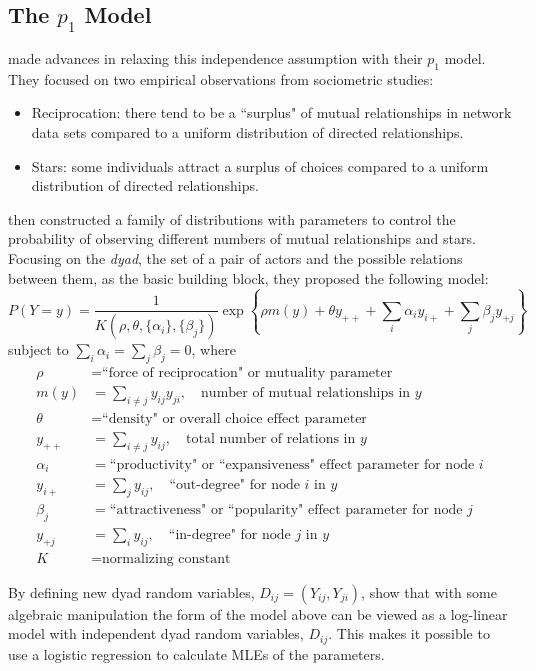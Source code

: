 \subsection{The $p_1$ Model}
\citet{Holland:1981} made advances in relaxing this independence assumption  with their $p_1$ model.  They focused on two empirical observations from sociometric studies:
\begin{itemize}
\item Reciprocation: there tend to be a ``surplus" of mutual relationships in network data sets compared to a uniform distribution of directed relationships.
\item Stars: some individuals attract a surplus of choices compared to a uniform distribution of directed relationships.
\end{itemize}
\citeauthor{Holland:1981} then constructed a family of distributions with parameters to control the probability of observing different numbers of mutual relationships and stars.  
Focusing on the \textit{dyad}, the set of a pair of actors and the possible relations between them, as the basic building block, they proposed the following model:
\[
	P( Y = y ) = \frac{1}{ K( \rho, \theta, \{ \alpha_i \}, \{\beta_j \} )}\exp \left \{  \rho m(y) + \theta y_{++} + \sum_i \alpha_i y_{i+} +  \sum_j \beta_j y_{+j}\right \}
\]
subject to $\sum_i \alpha_i = \sum_j \beta_j = 0$, where
\begin{align*}
	\rho &= \text{``force of reciprocation" or mutuality parameter}\\
	m(y) &= \sum_{i \neq j} y_{ij}y_{ji}, \quad \text{number of mutual relationships in $y$}\\
	\theta &= \text{``density" or overall choice effect parameter}\\
	y_{++} &= \sum_{i \neq j} y_{ij}, \quad  \text{total number of relations in $y$}\\
	\alpha_i &= \text{``productivity" or ``expansiveness" effect parameter for node $i$}\\
	y_{i+} &= \sum_{j} y_{ij}, \quad  \text{``out-degree" for node $i$ in $y$}\\
	\beta_j &= \text{``attractiveness" or ``popularity" effect parameter for node $j$} \\
	y_{+j} &= \sum_{i} y_{ij}, \quad  \text{``in-degree" for node $j$ in $y$}\\
	K &= \text{normalizing constant}
\end{align*}

By defining new dyad random variables, $D_{ij} = (Y_{ij}, Y_{ji} )$, \citeauthor{Holland:1981}  show that with some algebraic manipulation the form of the model above can be viewed as a log-linear model with independent dyad random variables, $D_{ij}$.  This makes it possible to use a logistic regression to calculate MLEs of the parameters.

